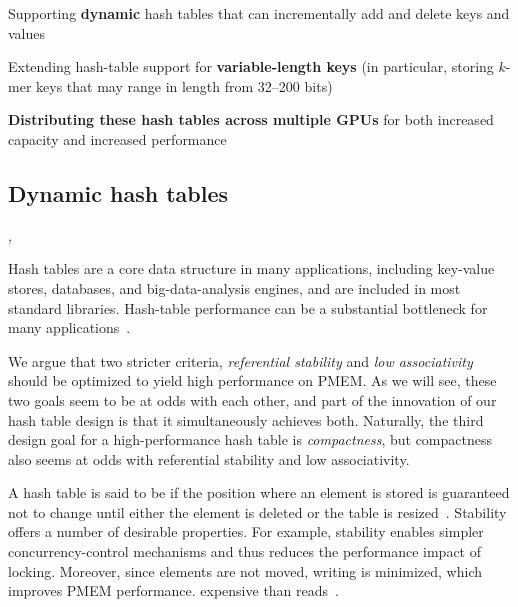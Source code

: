\begin{rproblem} Supporting \textbf{dynamic} hash tables that can incrementally add and delete keys and values \end{rproblem}

\begin{rproblem} Extending hash-table support for \textbf{variable-length keys} (in particular, storing $k$-mer keys that may range in length from 32--200 bits) \end{rproblem}

\begin{rproblem} \textbf{Distributing these hash tables across multiple GPUs} for both increased capacity and increased performance\end{rproblem}

\subsection{Dynamic hash tables}

\cite{Ashkiani:2018:ADH,Li:2021:DDH,Zhou:2021:DAD},

\noindent{}

Hash tables are a core data structure in many applications, including key-value
stores, databases, and big-data-analysis engines, and are included in most
standard libraries.  Hash-table performance can be a substantial bottleneck for
many applications~\cite{NealZu21,FanAn13,MetreveliZe12}.


We argue that two stricter criteria, \emph{referential stability} and \emph{low
associativity} should be optimized to yield high performance on PMEM.  As we
will see, these two goals seem to be at odds with each other, and part of the
innovation  of our hash table design is that it simultaneously achieves both.
Naturally, the third design goal for a high-performance hash table is
\emph{compactness}, but compactness also seems at odds with referential
stability and low associativity.

A hash table is said to be  if the position where an element is
stored is guaranteed not to change until either the element is deleted or the
table is resized~\cite{sandersstability,originalstability,KnuthVol3}.
Stability offers a number of desirable properties.  For example, stability
enables simpler concurrency-control mechanisms and thus reduces the performance
impact of locking.  Moreover, since elements are not moved, writing is
minimized, which improves PMEM performance.
expensive than reads~\cite{pmem-measurements}.

